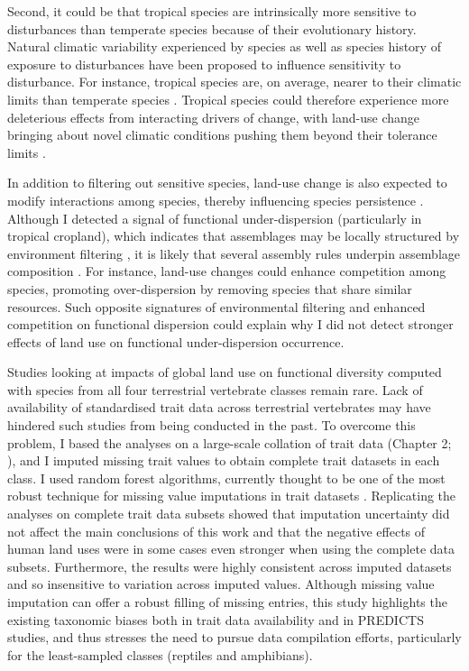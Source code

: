 Second, it could be that tropical species are intrinsically more sensitive to disturbances than temperate species because of their evolutionary history. Natural climatic variability experienced by species as well as species history of exposure to disturbances have been proposed to influence sensitivity to disturbance. For instance, tropical species are, on average, nearer to their climatic limits than temperate species \citep{Deutsch2008, Sunday2014a}. Tropical species could therefore experience more deleterious effects from interacting drivers of change, with land-use change bringing about novel climatic conditions pushing them beyond their tolerance limits \citep{Frishkoff2016, Williams2020a}.

In addition to filtering out sensitive species, land-use change is also expected to modify interactions among species, thereby influencing species persistence \citep{Tylianakis2008, Valiente-Banuet2015}. Although I detected a signal of functional under-dispersion (particularly in tropical cropland), which indicates that assemblages may be locally structured by environment filtering \citep{Bregman2015}, it is likely that several assembly rules underpin assemblage composition \citep{Fournier2016}. For instance, land-use changes could enhance competition among species, promoting over-dispersion by removing species that share similar resources. Such opposite signatures of environmental filtering and enhanced competition on functional dispersion could explain why I did not detect stronger effects of land use on functional under-dispersion occurrence.

Studies looking at impacts of global land use on functional diversity computed with species from all four terrestrial vertebrate classes remain rare. Lack of availability of standardised trait data across terrestrial vertebrates may have hindered such studies from being conducted in the past. To overcome this problem, I based the analyses on a large-scale collation of trait data (Chapter 2; \citet{Etard2020}), and I imputed missing trait values to obtain complete trait datasets in each class. I used random forest algorithms, currently thought to be one of the most robust technique for missing value imputations in trait datasets \citep{Debastiani2021, Johnson2021, Penone2014}. Replicating the analyses on complete trait data subsets showed that imputation uncertainty did not affect the main conclusions of this work and that the negative effects of human land uses were in some cases even stronger when using the complete data subsets. Furthermore, the results were highly consistent across imputed datasets and so insensitive to variation across imputed values. Although missing value imputation can offer a robust filling of missing entries, this study highlights the existing taxonomic biases both in trait data availability and in PREDICTS studies, and thus stresses the need to pursue data compilation efforts, particularly for the least-sampled classes (reptiles and amphibians).

